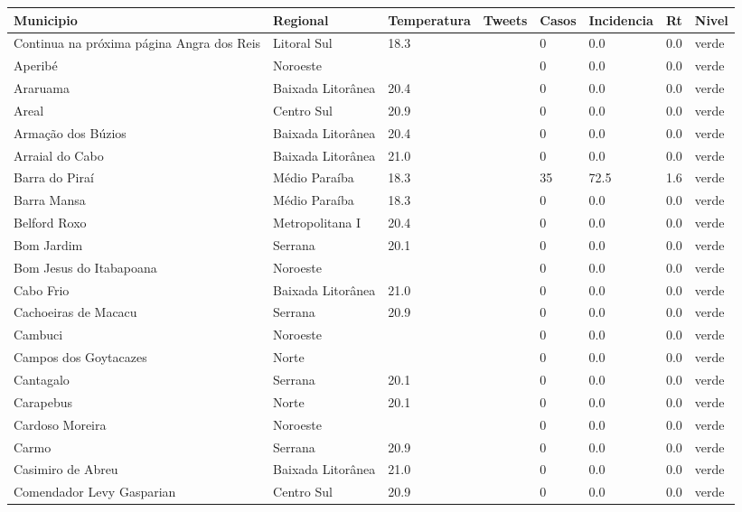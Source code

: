 \begin{longtable}{l|lllllll}
  \hline
Municipio & Regional & Temperatura & Tweets & Casos & Incidencia & Rt & Nivel \\ 
  \hline
\endhead
\hline
{\footnotesize Continua na próxima página}
\endfoot
\endlastfoot
Angra dos Reis & Litoral Sul & 18.3 &  & 0 & 0.0 & 0.0 & verde \\ 
  Aperibé & Noroeste &  &  & 0 & 0.0 & 0.0 & verde \\ 
  Araruama & Baixada Litorânea & 20.4 &  & 0 & 0.0 & 0.0 & verde \\ 
  Areal & Centro Sul & 20.9 &  & 0 & 0.0 & 0.0 & verde \\ 
  Armação dos Búzios & Baixada Litorânea & 20.4 &  & 0 & 0.0 & 0.0 & verde \\ 
  Arraial do Cabo & Baixada Litorânea & 21.0 &  & 0 & 0.0 & 0.0 & verde \\ 
  Barra do Piraí & Médio Paraíba & 18.3 &  & 35 & 72.5 & 1.6 & verde \\ 
  Barra Mansa & Médio Paraíba & 18.3 &  & 0 & 0.0 & 0.0 & verde \\ 
  Belford Roxo & Metropolitana I & 20.4 &  & 0 & 0.0 & 0.0 & verde \\ 
  Bom Jardim & Serrana & 20.1 &  & 0 & 0.0 & 0.0 & verde \\ 
  Bom Jesus do Itabapoana & Noroeste &  &  & 0 & 0.0 & 0.0 & verde \\ 
  Cabo Frio & Baixada Litorânea & 21.0 &  & 0 & 0.0 & 0.0 & verde \\ 
  Cachoeiras de Macacu & Serrana & 20.9 &  & 0 & 0.0 & 0.0 & verde \\ 
  Cambuci & Noroeste &  &  & 0 & 0.0 & 0.0 & verde \\ 
  Campos dos Goytacazes & Norte &  &  & 0 & 0.0 & 0.0 & verde \\ 
  Cantagalo & Serrana & 20.1 &  & 0 & 0.0 & 0.0 & verde \\ 
  Carapebus & Norte & 20.1 &  & 0 & 0.0 & 0.0 & verde \\ 
  Cardoso Moreira & Noroeste &  &  & 0 & 0.0 & 0.0 & verde \\ 
  Carmo & Serrana & 20.9 &  & 0 & 0.0 & 0.0 & verde \\ 
  Casimiro de Abreu & Baixada Litorânea & 21.0 &  & 0 & 0.0 & 0.0 & verde \\ 
  Comendador Levy Gasparian & Centro Sul & 20.9 &  & 0 & 0.0 & 0.0 & verde \\ 

\end{longtable}

